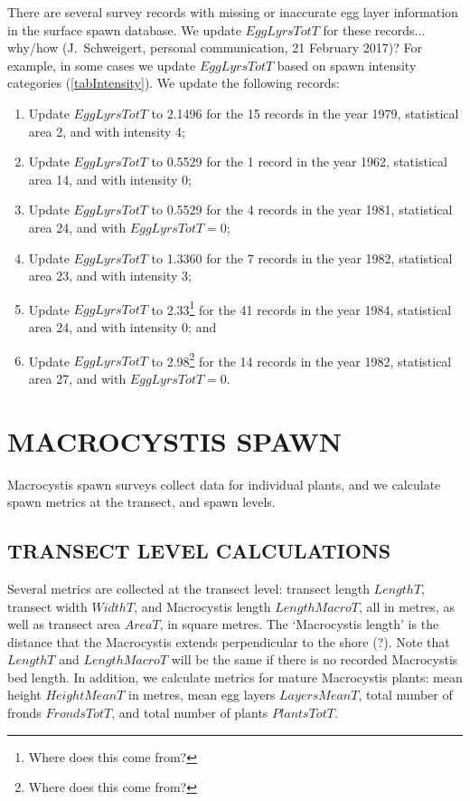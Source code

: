 \documentclass[12pt]{article}
\begin{document}
There are several survey records with missing or inaccurate egg layer information in the surface spawn database.
We update $EggLyrsTotT$ for these records... why/how  (J.~Schweigert, personal communication, 21 February 2017)?
For example, in some cases we update $EggLyrsTotT$ based on spawn intensity categories (\autoref{tabIntensity}).
We update the following records:
\begin{enumerate}
\item Update $EggLyrsTotT$ to 2.1496 for the 15 records in the year 1979, statistical area 2, and with intensity 4; \label{up1979}
\item Update $EggLyrsTotT$ to 0.5529 for the 1 record in the year 1962, statistical area 14, and with intensity 0; \label{up1962}
\item Update $EggLyrsTotT$ to 0.5529 for the 4 records in the year 1981, statistical area 24, and with $EggLyrsTotT = 0$; \label{up1981}
\item Update $EggLyrsTotT$ to 1.3360 for the 7 records in the year 1982, statistical area 23, and with intensity 3; \label{up1982a}
\item Update $EggLyrsTotT$ to 2.33\footnote{Where does this come from?} for the 41 records in the year 1984, statistical area 24, and with intensity 0; and \label{up1984}
\item Update $EggLyrsTotT$ to 2.98\footnote{Where does this come from?} for the 14 records in the year 1982, statistical area 27, and with $EggLyrsTotT = 0$. \label{up1982b}
\end{enumerate}

\section{MACROCYSTIS SPAWN}\label{secMacro}

Macrocystis spawn surveys collect data for individual plants, and we calculate spawn metrics at the transect, and spawn levels.

\subsection{TRANSECT LEVEL CALCULATIONS}

Several metrics are collected at the transect level: transect length $LengthT$, transect width $WidthT$, and Macrocystis length $LengthMacroT$, all in metres, as well as transect area $AreaT$, in square metres.
The `Macrocystis length' is the distance that the Macrocystis extends perpendicular to the shore (?).
Note that $LengthT$ and $LengthMacroT$ will be the same if there is no recorded Macrocystis bed length.
In addition, we calculate metrics for mature Macrocystis plants: mean height $HeightMeanT$ in metres, mean egg layers $LayersMeanT$, total number of fronds $FrondsTotT$, and total number of plants $PlantsTotT$.
\end{document}
